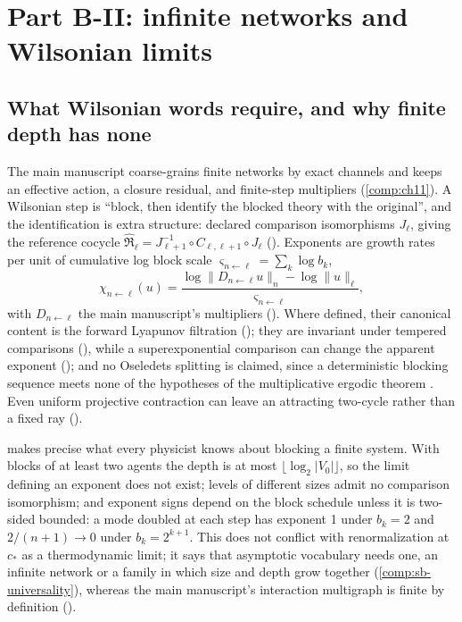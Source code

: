 \section{Part B-II: infinite networks and Wilsonian limits}
\label{comp:sb-wilson}

\subsection{What Wilsonian words require, and why finite depth has none}
\label{comp:sb-finite-depth}

The main manuscript coarse-grains finite networks by exact channels and keeps an effective action, a
closure residual, and finite-step multipliers (\cref{comp:ch11}). A Wilsonian step is ``block, then
identify the blocked theory with the original'', and the identification is extra structure: declared
comparison isomorphisms \(J_\ell\), giving the reference cocycle
\(\widehat{\mathfrak R}_\ell=J_{\ell+1}^{-1}\circ C_{\ell,\ell+1}\circ J_\ell\) ().
Exponents are growth rates per unit of cumulative log block scale \(\varsigma_{n\leftarrow\ell}=\sum_k\log
b_k\),
\[
\chi_{n\leftarrow\ell}(u)=\frac{\log\lVert D_{n\leftarrow\ell}u\rVert_n-\log\lVert u\rVert_\ell}{\varsigma_{n\leftarrow\ell}},
\]
with \(D_{n\leftarrow\ell}\) the main manuscript's multipliers (). Where defined,
their canonical content is the forward Lyapunov filtration (); they are
invariant under tempered comparisons (), while a superexponential
comparison can change the apparent exponent (); and no Oseledets splitting is
claimed, since a deterministic blocking sequence meets none of the hypotheses of the multiplicative
ergodic theorem \citep{Oseledets1968}. Even uniform projective contraction can leave an attracting
two-cycle rather than a fixed ray ().

 makes precise what every physicist knows about blocking a finite
system. With blocks of at least two agents the depth is at most \(\lfloor\log_2\lvert V_0\rvert\rfloor\), so
the limit defining an exponent does not exist; levels of different sizes admit no comparison isomorphism;
and exponent signs depend on the block schedule unless it is two-sided bounded: a mode doubled at each step has exponent 1 under
\(b_k=2\) and \(2/(n+1)\to0\) under \(b_k=2^{k+1}\). This does not conflict with renormalization at
\(c_*\) as a thermodynamic limit; it says that asymptotic vocabulary needs one, an infinite network or a
family in which size and depth grow together (\cref{comp:sb-universality}), whereas the main manuscript's
interaction multigraph is finite by definition ().

